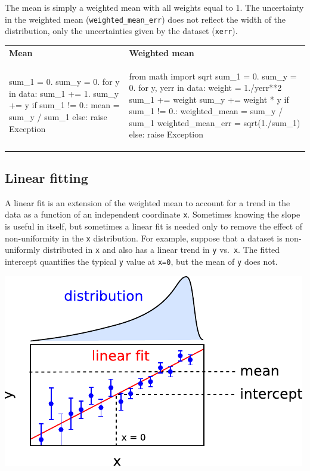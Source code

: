 \documentclass[12pt]{article}
\begin{document}
The mean is simply a weighted mean with all weights equal to 1.  The
uncertainty in the weighted mean ({\tt weighted\_mean\_err}) does not
reflect the width of the distribution, only the uncertainties given by
the dataset ({\tt xerr}).

\vspace{0.6 cm}
\begin{tabular}{p{0.4\linewidth} p{0.6\linewidth}}
{\bf Mean} & {\bf Weighted mean} \\
\begin{python}
sum_1 = 0.
sum_y = 0.
for y in data:
    sum_1 += 1.
    sum_y += y
if sum_1 != 0.:
    mean = sum_y / sum_1
else: raise Exception
\end{python} &
\begin{python}
from math import sqrt
sum_1 = 0.
sum_y = 0.
for y, yerr in data:
    weight = 1./yerr**2
    sum_1 += weight
    sum_y += weight * y
if sum_1 != 0.:
    weighted_mean = sum_y / sum_1
    weighted_mean_err = sqrt(1./sum_1)
else: raise Exception
\end{python}
\end{tabular}

\subsection{Linear fitting}

A linear fit is an extension of the weighted mean to account for a
trend in the data as a function of an independent coordinate {\tt x}.
Sometimes knowing the slope is useful in itself, but sometimes a
linear fit is needed only to remove the effect of non-uniformity in
the {\tt x} distribution.  For example, suppose that a dataset is
non-uniformly distributed in {\tt x} and also has a linear trend in
{\tt y} vs.\ {\tt x}.  The fitted intercept quantifies the typical
{\tt y} value at {\tt x=0}, but the mean of {\tt y} does not.

\begin{center}
\includegraphics[width=0.5\linewidth]{PLOTS/nonuniform_explanation.pdf}
\end{center}
\end{document}
